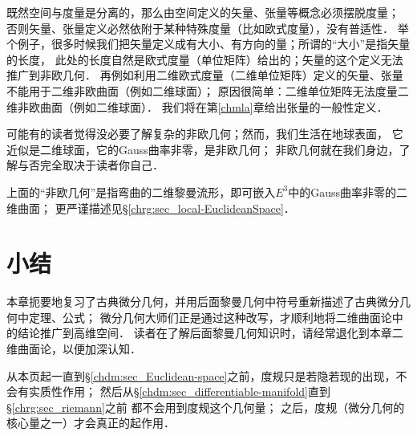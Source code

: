 既然空间与度量是分离的，那么由空间定义的矢量、张量等概念必须摆脱度量；
否则矢量、张量定义必然依附于某种特殊度量（比如欧式度量），没有普适性．
举个例子，很多时候我们把矢量定义成有大小、有方向的量；所谓的“大小”是指矢量的长度，
此处的长度自然是欧式度量（单位矩阵）给出的；矢量的这个定义无法推广到非欧几何．
再例如利用二维欧式度量（二维单位矩阵）定义的矢量、张量不能用于二维非欧曲面（例如二维球面）；
原因很简单：{\kaishu 二维单位矩阵无法度量二维非欧曲面（例如二维球面）．}
我们将在第\ref{chmla}章给出张量的一般性定义．

可能有的读者觉得没必要了解复杂的非欧几何；然而，我们生活在地球表面，
它近似是二维球面，它的Gauss曲率非零，是非欧几何；
非欧几何就在我们身边，了解与否完全取决于读者你自己．

\begin{remark}
	上面的“非欧几何”是指弯曲的二维黎曼流形，即可嵌入$E^3$中的Gauss曲率非零的二维曲面；
	更严谨描述见\S\ref{chrg:sec_local-EuclideanSpace}．
\end{remark}


\section*{小结}
本章扼要地复习了古典微分几何，并用后面黎曼几何中符号重新描述了古典微分几何中定理、公式；
微分几何大师们正是通过这种改写，才顺利地将二维曲面论中的结论推广到高维空间．
读者在了解后面黎曼几何知识时，请经常退化到本章二维曲面论，以便加深认知．


从本页起一直到\S\ref{chdm:sec_Euclidean-space}之前，度规只是若隐若现的出现，不会有实质性作用；
然后从\S\ref{chdm:sec_differentiable-manifold}直到\S\ref{chrg:sec_riemann}之前
都不会用到度规这个几何量；
之后，度规（微分几何的核心量之一）才会真正的起作用．


\printbibliography[heading=subbibliography,title=第\ref{chcdg}章参考文献]


\endinput
